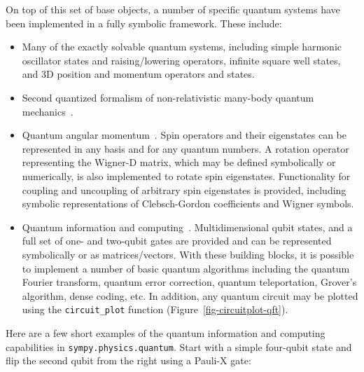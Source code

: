 On top of this set of base objects, a number of specific quantum systems have
been implemented in a fully symbolic framework. These include:

\begin{itemize}

\item Many of the exactly solvable quantum systems, including simple harmonic
oscillator states and raising/lowering operators, infinite square well states,
and 3D position and momentum operators and states.

\item Second quantized formalism of non-relativistic many-body quantum
mechanics~\cite{FetterWalecka2003}.

\item Quantum angular momentum~\cite{Zare1991}. Spin operators and their
eigenstates can be represented in any basis and for any quantum numbers.
A rotation operator representing the Wigner-D matrix, which may be defined
symbolically or numerically, is also implemented to rotate spin eigenstates.
Functionality for coupling and uncoupling of arbitrary spin eigenstates is
provided, including symbolic representations of Clebsch-Gordon coefficients and
Wigner symbols.

\item Quantum information and computing~\cite{Nielsen2011}. Multidimensional
qubit states, and a full set of one- and two-qubit gates are provided and can
be represented symbolically or as matrices/vectors. With these building blocks,
it is possible to implement a number of basic quantum algorithms including the
quantum Fourier transform, quantum error correction, quantum teleportation,
Grover's algorithm, dense coding, etc. In addition, any quantum circuit may be
plotted using the \verb|circuit_plot| function (Figure~\ref{fig-circuitplot-qft}).


\end{itemize}

Here are a few short examples of the quantum information and computing capabilities
in \verb|sympy.physics.quantum|. Start with a simple four-qubit state and flip the second
qubit from the right using a Pauli-X gate:

